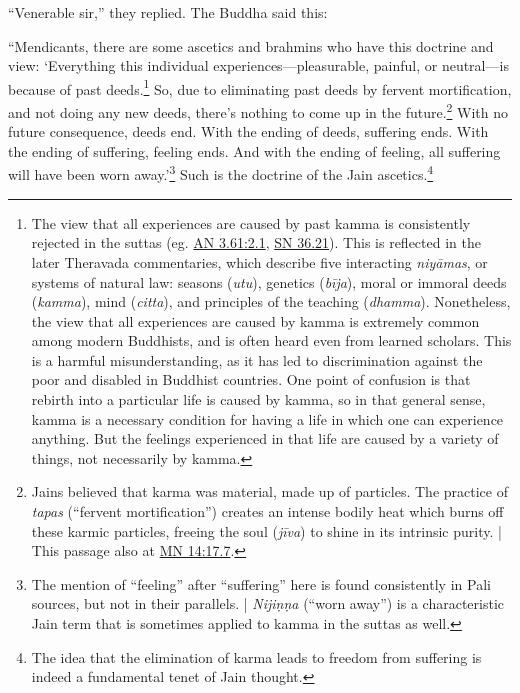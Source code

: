 \documentclass[12pt,openany]{book}%
\begin{document}
“Venerable sir,” they replied. The Buddha said this: 

“Mendicants, there are some ascetics and brahmins who have this doctrine and view: ‘Everything this individual experiences—pleasurable, painful, or neutral—is because of past deeds.\footnote{The view that all experiences are caused by past kamma is consistently rejected in the suttas (eg. \href{https://suttacentral.net/an3.61/en/sujato\#2.1}{AN 3.61:2.1}, \href{https://suttacentral.net/sn36.21/en/sujato}{SN 36.21}). This is reflected in the later Theravada commentaries, which describe five interacting \textit{\textsanskrit{niyāmas}}, or systems of natural law: seasons (\textit{utu}), genetics (\textit{\textsanskrit{bīja}}), moral or immoral deeds (\textit{kamma}), mind (\textit{citta}), and principles of the teaching (\textit{dhamma}). Nonetheless, the view that all experiences are caused by kamma is extremely common among modern Buddhists, and is often heard even from learned scholars. This is a harmful misunderstanding, as it has led to discrimination against the poor and disabled in Buddhist countries. One point of confusion is that rebirth into a particular life is caused by kamma, so in that general sense, kamma is a necessary condition for having a life in which one can experience anything. But the feelings experienced in that life are caused by a variety of things, not necessarily by kamma. } So, due to eliminating past deeds by fervent mortification, and not doing any new deeds, there’s nothing to come up in the future.\footnote{Jains believed that karma was material, made up of particles. The practice of \textit{tapas} (“fervent mortification”) creates an intense bodily heat which burns off these karmic particles, freeing the soul (\textit{\textsanskrit{jīva}}) to shine in its intrinsic purity. | This passage also at \href{https://suttacentral.net/mn14/en/sujato\#17.7}{MN 14:17.7}. } With no future consequence, deeds end. With the ending of deeds, suffering ends. With the ending of suffering, feeling ends. And with the ending of feeling, all suffering will have been worn away.’\footnote{The mention of “feeling” after “suffering” here is found consistently in Pali sources, but not in their parallels. | \textit{\textsanskrit{Nijiṇṇa}} (“worn away”) is a characteristic Jain term that is sometimes applied to kamma in the suttas as well. } Such is the doctrine of the Jain ascetics.\footnote{The idea that the elimination of karma leads to freedom from suffering is indeed a fundamental tenet of Jain thought. } 
\end{document}
